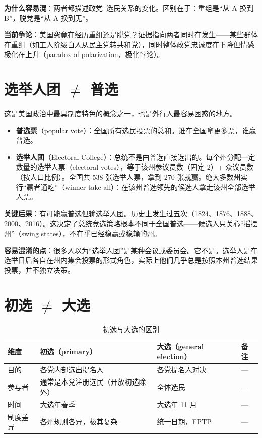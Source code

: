 \documentclass[12pt,a4paper]{ctexart}
\begin{document}
\textbf{为什么容易混}：两者都描述政党--选民关系的变化。区别在于：重组是``从 A 换到 B''，脱党是``从 A 换到无''。

\textbf{当前争论}：美国究竟在经历重组还是脱党？证据指向两者同时在发生——某些群体在重组（如工人阶级白人从民主党转共和党），同时整体政党忠诚度在下降但情感极化在上升（paradox of polarization，极化悖论）。

\section{选举人团 $\neq$ 普选}

这是美国政治中最具制度特色的概念之一，也是外行人最容易困惑的地方。

\begin{itemize}
  \item \textbf{普选票}（popular vote）：全国所有选民投票的总和。谁在全国拿更多票，谁赢普选。
  \item \textbf{选举人团}（Electoral College）：总统不是由普选直接选出的。每个州分配一定数量的选举人票（electoral votes），等于该州参议员数（固定 2）+ 众议员数（按人口比例）。全国共 538 张选举人票，拿到 270 张就赢。绝大多数州实行``赢者通吃''（winner-take-all）：在该州普选领先的候选人拿走该州全部选举人票。
\end{itemize}

\textbf{关键后果}：有可能赢普选但输选举人团。历史上发生过五次（1824、1876、1888、2000、2016）。这决定了总统竞选策略根本不同于全国普选——候选人只关心``摇摆州''（swing states），不在乎已经稳赢或稳输的州。

\textbf{容易混淆的点}：很多人以为``选举人团''是某种会议或委员会。它不是。选举人是在选举日后各自在州内集会投票的形式角色，实际上他们几乎总是按照本州普选结果投票，并不独立决策。

\section{初选 $\neq$ 大选}

\begin{table}[h]
\centering
\caption{初选与大选的区别}
\begin{tabular}{@{}lp{4.4cm}p{4.4cm}p{4.6cm}@{}}
\toprule
\textbf{维度} & \textbf{初选（primary）} & \textbf{大选（general election）} & \textbf{备注} \\
\midrule
目的 & 各党内部选出提名人 & 各党提名人对决 & --- \\
参与者 & 通常是本党注册选民（开放初选除外） & 全体选民 & --- \\
时间 & 大选年春季 & 大选年 11 月 & --- \\
制度差异 & 各州规则各异，极其复杂 & 统一日期，FPTP & --- \\
\bottomrule
\end{tabular}
\end{table}
\end{document}
